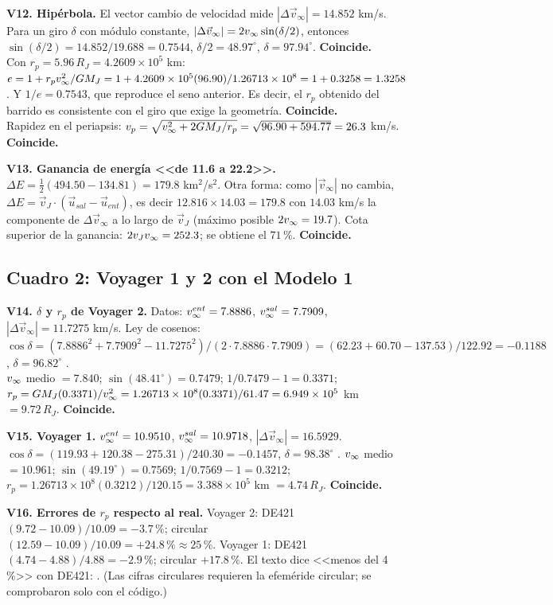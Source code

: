 \documentclass[11pt,letterpaper]{article}
\newcommand{\ok}{\textbf{Coincide.}\ }
\begin{document}
\textbf{V12. Hipérbola.} El vector cambio de velocidad mide $|\Delta\vec v_\infty|=14.852$ km/s. Para un giro $\delta$ con módulo constante, $|\Delta\vec v_\infty|=2v_\infty\sin(\delta/2)$, entonces $\sin(\delta/2)=14.852/19.688=0.7544$, $\delta/2=48.97^\circ$, $\delta=97.94^\circ$. \ok\\
Con $r_p=5.96\,R_J=4.2609\times10^5$ km: $e=1+r_pv_\infty^2/GM_J=1+4.2609\times10^5(96.90)/1.26713\times10^8=1+0.3258=1.3258$. Y $1/e=0.7543$, que reproduce el seno anterior. Es decir, el $r_p$ obtenido del barrido es consistente con el giro que exige la geometría. \ok\\
Rapidez en el periapsis: $v_p=\sqrt{v_\infty^2+2GM_J/r_p}=\sqrt{96.90+594.77}=26.3$ km/s. \ok

\textbf{V13. Ganancia de energía <<de 11.6 a 22.2>>.} $\Delta E=\tfrac12(494.50-134.81)=179.8$ km$^2$/s$^2$. Otra forma: como $|\vec v_\infty|$ no cambia, $\Delta E=\vec v_J\cdot(\vec u_{sal}-\vec u_{ent})$, es decir $12.816\times14.03=179.8$ con $14.03$ km/s la componente de $\Delta\vec v_\infty$ a lo largo de $\vec v_J$ (máximo posible $2v_\infty=19.7$). Cota superior de la ganancia: $2v_Jv_\infty=252.3$; se obtiene el $71\,\%$. \ok

\subsection*{Cuadro 2: Voyager 1 y 2 con el Modelo 1}
\textbf{V14. $\delta$ y $r_p$ de Voyager 2.} Datos: $v_\infty^{ent}=7.8886$, $v_\infty^{sal}=7.7909$, $|\Delta\vec v_\infty|=11.7275$ km/s. Ley de cosenos: $\cos\delta=(7.8886^2+7.7909^2-11.7275^2)/(2\cdot7.8886\cdot7.7909)=(62.23+60.70-137.53)/122.92=-0.1188$, $\delta=96.82^\circ$ .\\
$v_\infty$ medio $=7.840$; $\sin(48.41^\circ)=0.7479$; $1/0.7479-1=0.3371$; $r_p=GM_J(0.3371)/v_\infty^2=1.26713\times10^8(0.3371)/61.47=6.949\times10^5$ km $=9.72\,R_J$. \ok

\textbf{V15. Voyager 1.} $v_\infty^{ent}=10.9510$, $v_\infty^{sal}=10.9718$, $|\Delta\vec v_\infty|=16.5929$. $\cos\delta=(119.93+120.38-275.31)/240.30=-0.1457$, $\delta=98.38^\circ$ . $v_\infty$ medio $=10.961$; $\sin(49.19^\circ)=0.7569$; $1/0.7569-1=0.3212$; $r_p=1.26713\times10^8(0.3212)/120.15=3.388\times10^5$ km $=4.74\,R_J$. \ok

\textbf{V16. Errores de $r_p$ respecto al real.} Voyager 2: DE421 $(9.72-10.09)/10.09=-3.7\,\%$; circular $(12.59-10.09)/10.09=+24.8\,\%\approx25\,\%$. Voyager 1: DE421 $(4.74-4.88)/4.88=-2.9\,\%$; circular $+17.8\,\%$. El texto dice <<menos del 4\,\%>> con DE421: . (Las cifras circulares requieren la efeméride circular; se comprobaron solo con el código.)
\end{document}
